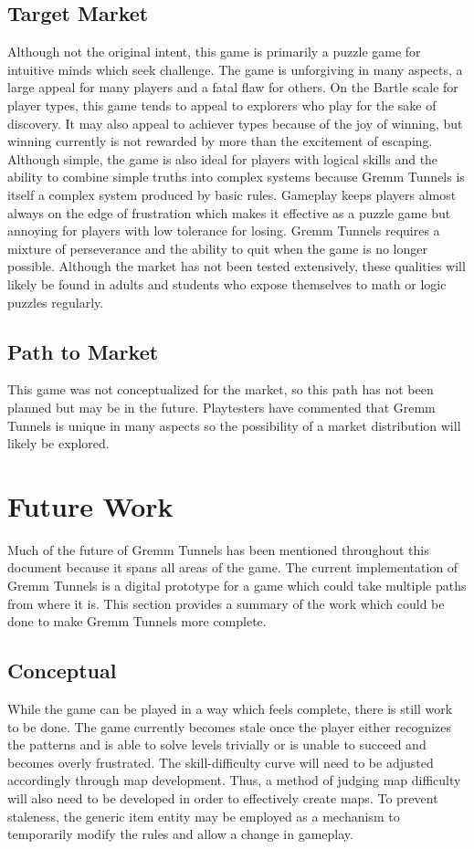 \documentclass{scrreprt}
\begin{document}
		\section{Target Market}
			Although not the original intent, this game is primarily a puzzle game for intuitive minds which seek challenge. The game is unforgiving in many aspects, a large appeal for many players and a fatal flaw for others. On the Bartle scale for player types, this game tends to appeal to explorers who play for the sake of discovery. It may also appeal to achiever types because of the joy of winning, but winning currently is not rewarded by more than the excitement of escaping. Although simple, the game is also ideal for players with logical skills and the ability to combine simple truths into complex systems because Gremm Tunnels is itself a complex system produced by basic rules. Gameplay keeps players almost always on the edge of frustration which makes it effective as a puzzle game but annoying for players with low tolerance for losing. Gremm Tunnels requires a mixture of perseverance and the ability to quit when the game is no longer possible. Although the market has not been tested extensively, these qualities will likely be found in adults and students who expose themselves to math or logic puzzles regularly. 
		
		\section{Path to Market}
			This game was not conceptualized for the market, so this path has not been planned but may be in the future. Playtesters have commented that Gremm Tunnels is unique in many aspects so the possibility of a market distribution will likely be explored. 
		
	\chapter{Future Work}
		Much of the future of Gremm Tunnels has been mentioned throughout this document because it spans all areas of the game. The current implementation of Gremm Tunnels is a digital prototype for a game which could take multiple paths from where it is. This section provides a summary of the work which could be done to make Gremm Tunnels more complete.
		
		\section{Conceptual}
			While the game can be played in a way which feels complete, there is still work to be done. The game currently becomes stale once the player either recognizes the patterns and is able to solve levels trivially or is unable to succeed and becomes overly frustrated. The skill-difficulty curve will need to be adjusted accordingly through map development. Thus, a method of judging map difficulty will also need to be developed in order to effectively create maps. To prevent staleness, the generic item entity may be employed as a mechanism to temporarily modify the rules and allow a change in gameplay.
		
\end{document}
